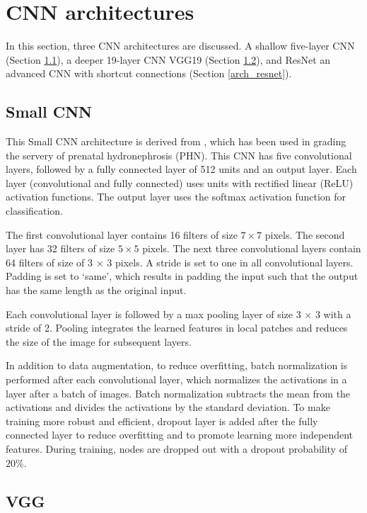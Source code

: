 \chapter{CNN architectures} 
\label{cnn_architectures}
In this section, three CNN architectures are discussed. A shallow five-layer CNN\cite{Dhindsa2018} (Section \ref{arch_small}), a deeper 19-layer CNN VGG19\citep{vgg} (Section \ref{arch_vgg}), and ResNet\citep{resnet} an advanced CNN with shortcut connections (Section \ref{arch_resnet}).

\section{Small CNN}
\label{arch_small}
This Small CNN architecture is derived from \cite{Dhindsa2018}, which has been used in grading the servery of prenatal hydronephrosis (PHN). This CNN has five convolutional layers, followed by a fully connected layer of 512 units and an output layer. Each layer (convolutional and fully connected) uses units with rectified linear (ReLU) activation functions. The output layer uses the softmax activation function for classification. 

The first convolutional layer contains 16 filters of size $7 \times 7$ pixels. The second layer has 32 filters of size $5 \times 5$ pixels. The next three convolutional layers contain 64 filters of size of 3 $\times$ 3 pixels. A stride is set to one in all convolutional layers. Padding is set to ‘same’, which results in padding the input such that the output has the same length as the original input.

Each convolutional layer is followed by a max pooling layer of size 3 $\times$ 3 with a stride of 2. Pooling integrates the learned features in local patches and reduces the size of the image for subsequent layers. 

In addition to data augmentation, to reduce overfitting, batch normalization is performed after each convolutional layer, which normalizes the activations in a layer after a batch of images. Batch normalization subtracts the mean from the activations and divides the activations by the standard deviation. To make training more robust and efficient, dropout layer is added after the fully connected layer to reduce overfitting and to promote learning more independent features. During training, nodes are dropped out with a dropout probability of $20\%$.

\section{VGG}
\label{arch_vgg}

